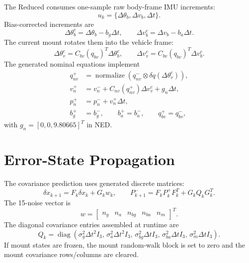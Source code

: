 \documentclass[11pt]{article}
\newcommand{\T}{^{T}}
\newcommand{\dq}{\delta q}
\newcommand{\dt}{\Delta t}
\begin{document}
The Reduced consumes one-sample raw body-frame IMU increments:
\begin{equation}
  u_k = \{\Delta\theta_b,\Delta v_b,\dt\}.
\end{equation}
Bias-corrected increments are
\begin{equation}
  \Delta\theta_b^c=\Delta\theta_b-b_g\dt,\qquad
  \Delta v_b^c=\Delta v_b-b_a\dt .
\end{equation}
The current mount rotates them into the vehicle frame:
\begin{equation}
  \Delta\theta_v^c=C_{bv}(q_{bv})\T\Delta\theta_b^c,\qquad
  \Delta v_v^c=C_{bv}(q_{bv})\T\Delta v_b^c .
\end{equation}
The generated nominal equations implement
\begin{align}
  q_{nv}^{+} &= \operatorname{normalize}\left(q_{nv}^{-}\otimes
  \dq(\Delta\theta_v^c)\right),\\
  v_n^{+} &= v_n^{-}+C_{nv}(q_{nv}^{+})\Delta v_v^c+g_n\dt,\\
  p_n^{+} &= p_n^{-}+v_n^{+}\dt,\\
  b_g^{+}&=b_g^{-},\qquad b_a^{+}=b_a^{-},\qquad q_{bv}^{+}=q_{bv}^{-},
\end{align}
with \(g_n=[0,0,9.80665]\T\) in NED.

\section{Error-State Propagation}

The covariance prediction uses generated discrete matrices:
\begin{equation}
  \delta x_{k+1}=F_k\delta x_k+G_kw_k,
  \qquad
  P_{k+1}^{-}=F_kP_k^{+}F_k\T+G_kQ_kG_k\T .
\end{equation}
The 15-noise vector is
\begin{equation}
  w=
  \begin{bmatrix}
  n_g & n_a & n_{bg} & n_{ba} & n_m
  \end{bmatrix}\T .
\end{equation}
The diagonal covariance entries assembled at runtime are
\begin{equation}
  Q_k=\operatorname{diag}\left(
  \sigma_g^2\dt^2 I_3,\,
  \sigma_a^2\dt^2 I_3,\,
  \sigma_{bg}^2\dt I_3,\,
  \sigma_{ba}^2\dt I_3,\,
  \sigma_m^2\dt I_3
  \right).
\end{equation}
If mount states are frozen, the mount random-walk block is set to zero
and the mount covariance rows/columns are cleared.
\end{document}
